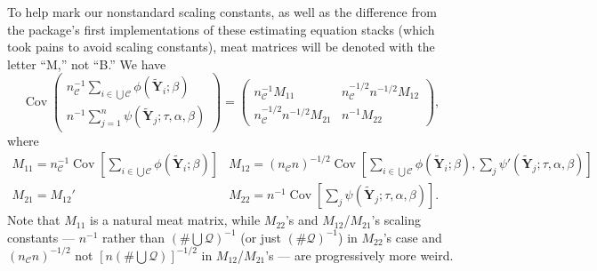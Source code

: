 \documentclass{article}
\begin{document}
To help mark our nonstandard scaling constants, as well as the difference from the package's first implementations of these estimating equation stacks (which took pains to avoid scaling constants), 
meat matrices will be denoted with the letter ``M,'' not ``B.''
We have
\[
\operatorname{Cov}\left(
     \begin{array}{c}
       n_{\mathcal{C}}^{-1}\sum_{i\in \bigcup \mathcal{C}}\phi(\tilde{\mathbf{Y}}_{i}; \beta )\\
       n^{-1}\sum_{j=1}^{n}\psi(\tilde{\mathbf{Y}}_{j}; \tau, \alpha, \beta )
     \end{array}
\right) = \left(
  \begin{array}{cc}
    n_{\mathcal{C}}^{-1}M_{11}& n_{\mathcal{C}}^{-1/2}n^{-1/2} M_{12}\\
    n_{\mathcal{C}}^{-1/2}n^{-1/2} M_{21} & n^{-1}M_{22}
  \end{array}
\right),
\]
where
\[
  \begin{array}{cc}
    M_{11}  = n_{\mathcal{C}}^{-1}\operatorname{Cov}[\sum_{i\in \bigcup
             \mathcal{C}} \phi(\tilde{\mathbf{Y}}_{i}; \beta )] &
                                                                  M_{12}=
                                                                  (n_{\mathcal{C}}n)^{-1/2} \operatorname{Cov}[\sum_{i\in \bigcup
             \mathcal{C}}\phi(\tilde{\mathbf{Y}}_{i};
                                                                  \beta
                                                                  ), \sum_{j}\psi'(\tilde{\mathbf{Y}}_{j}; \tau, \alpha, \beta )]\\
    M_{21}=M_{12}' & M_{22} = n^{-1}\operatorname{Cov}[\sum_{j}\psi(\tilde{\mathbf{Y}}_{j};
                     \tau, \alpha, \beta )] .
    \end{array}
\]
Note that $M_{11}$ is a natural meat matrix, while $M_{22}$'s and
$M_{12}$/$M_{21}$'s scaling constants --- $n^{-1}$ rather than $(\# \bigcup
\mathcal{Q})^{-1}$ (or just $(\# \mathcal{Q})^{-1}$) in $M_{22}$'s
case and $(n_{\mathcal{C}}n)^{-1/2}$ not $[n (\# \bigcup
\mathcal{Q})]^{-1/2}$ in $M_{12}$/$M_{21}$'s --- are progressively more weird.
\end{document}
